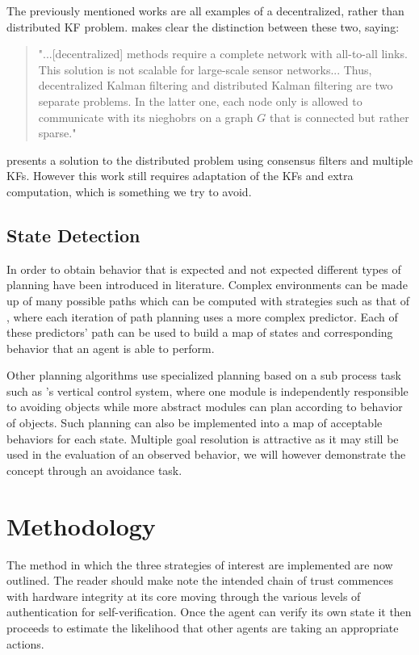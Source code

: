 \documentclass[conference]{IEEEtran}
\begin{document}
The previously mentioned works are all examples of a decentralized, rather than distributed KF problem. \cite{Olfati-Saber2005} makes clear the distinction between these two, saying:
\begin{quote}"...[decentralized] methods require a complete network with all-to-all links. This solution is not scalable for large-scale sensor networks... Thus, decentralized Kalman filtering and distributed Kalman filtering are two separate problems. In the latter one, each node only is allowed to communicate with its nieghobrs on a graph $G$ that is connected but rather sparse."
\end{quote}
\cite{Olfati-Saber2005} presents a solution to the distributed problem using consensus filters and multiple KFs. However this work still requires adaptation of the KFs and extra computation, which is something we try to avoid.

\subsection{State Detection}

In order to obtain behavior that is expected and not expected different types of planning have been introduced in literature. Complex environments can be made up of many possible paths which can be computed with strategies such as that of \cite{tallavajhula2016list}, where each iteration of path planning uses a more complex predictor. Each of these predictors' path can be used to build a map of states and corresponding behavior that an agent is able to perform. 

Other planning algorithms use specialized planning based on a sub process task such as \cite{ahn2008robust}'s vertical control system, where one module is independently responsible to avoiding objects while more abstract modules can plan according to behavior of objects. Such planning can also be implemented into a map of acceptable behaviors for each state. Multiple goal resolution is attractive as it may still be used in the evaluation of an observed behavior, we will however demonstrate the concept through an avoidance task.

\section{Methodology}

The method in which the three strategies of interest are implemented are now outlined. The reader should make note the intended chain of trust commences with hardware integrity at its core moving through the various levels of authentication for self-verification. 
Once the agent can verify its own state it then proceeds to estimate the likelihood that other agents are taking an appropriate actions. 
\end{document}
